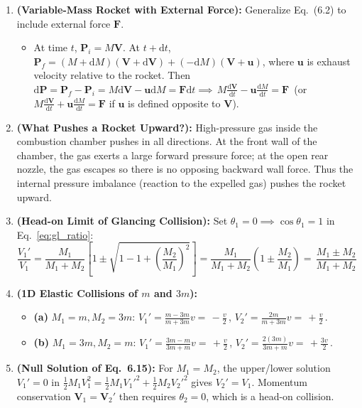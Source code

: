 \documentclass[11pt,a4paper,openany,oneside]{book}
\newcommand{\eqbox}[1]{\boxed{\,#1\,}}
\newcommand{\vect}[1]{\mathbf{#1}}
\newcommand{\diff}{\mathrm{d}}
\numberwithin{equation}{chapter}
\begin{document}
\begin{enumerate}[label=\textbf{Ex.\ 6.\arabic*},leftmargin=3.5em]
  \item \textbf{(Variable-Mass Rocket with External Force):} Generalize Eq.\ (6.2) to include external force $\vect{F}$.
  \begin{itemize}
    \item At time $t$, $\vect{P}_i = M\vect{V}$. At $t+\diff t$, $\vect{P}_f = (M+\diff M)(\vect{V}+\diff\vect{V}) + (-\diff M)(\vect{V}+\vect{u})$, where $\vect{u}$ is exhaust velocity relative to the rocket. Then $\diff\vect{P} = \vect{P}_f - \vect{P}_i = M\diff\vect{V} - \vect{u}\diff M = \vect{F}\diff t \implies \eqbox{M\frac{\diff\vect{V}}{\diff t} - \vect{u}\frac{\diff M}{\diff t} = \vect{F}}$ (or $M\frac{\diff\vect{V}}{\diff t} + \vect{u}\frac{\diff M}{\diff t} = \vect{F}$ if $\vect{u}$ is defined opposite to $\vect{V}$).
  \end{itemize}

  \item \textbf{(What Pushes a Rocket Upward?):} High-pressure gas inside the combustion chamber pushes in all directions. At the front wall of the chamber, the gas exerts a large forward pressure force; at the open rear nozzle, the gas escapes so there is no opposing backward wall force. Thus the internal pressure imbalance (reaction to the expelled gas) pushes the rocket upward.

  \item \textbf{(Head-on Limit of Glancing Collision):} Set $\theta_1 = 0 \implies \cos\theta_1 = 1$ in Eq.\ \eqref{eq:gl_ratio}:
  \begin{equation*}
    \frac{V_1'}{V_1} = \frac{M_1}{M_1+M_2}\!\left[1 \pm \sqrt{1 - 1 + \left(\frac{M_2}{M_1}\right)^2}\right] = \frac{M_1}{M_1+M_2}\!\left(1 \pm \frac{M_2}{M_1}\right) = \eqbox{\frac{M_1 \pm M_2}{M_1 + M_2}}
  \end{equation*}

  \item \textbf{(1D Elastic Collisions of $m$ and $3m$):}
  \begin{itemize}
    \item \textbf{(a)} $M_1 = m, M_2 = 3m$: $V_1' = \frac{m-3m}{m+3m}v = \eqbox{-\frac{v}{2}}$, $V_2' = \frac{2m}{m+3m}v = \eqbox{+\frac{v}{2}}$.
    \item \textbf{(b)} $M_1 = 3m, M_2 = m$: $V_1' = \frac{3m-m}{3m+m}v = \eqbox{+\frac{v}{2}}$, $V_2' = \frac{2(3m)}{3m+m}v = \eqbox{+\frac{3v}{2}}$.
  \end{itemize}

  \item \textbf{(Null Solution of Eq.\ 6.15):} For $M_1 = M_2$, the upper/lower solution $V_1' = 0$ in $\frac{1}{2}M_1 V_1^2 = \frac{1}{2}M_1 V_1'^2 + \frac{1}{2}M_2 V_2'^2$ gives $V_2' = V_1$. Momentum conservation $\vect{V}_1 = \vect{V}_2'$ then requires $\theta_2 = 0$, which is a head-on collision.


\end{enumerate}
\end{document}
